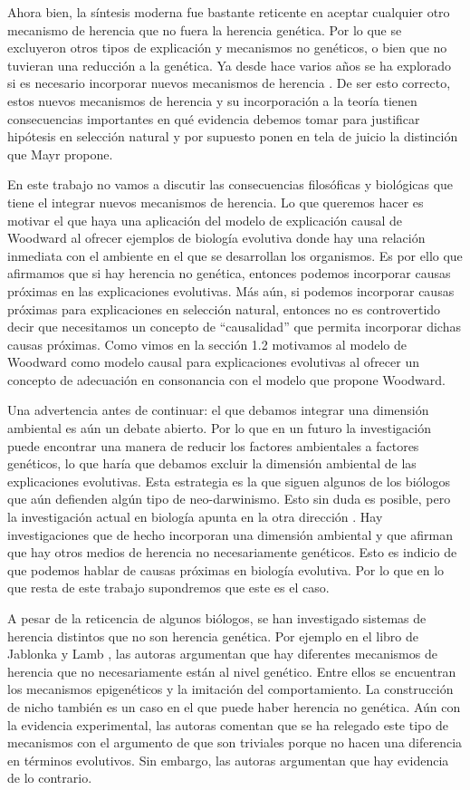 Ahora bien, la síntesis moderna fue bastante reticente en aceptar cualquier otro mecanismo de herencia que no fuera la herencia genética. Por lo que se excluyeron otros tipos de explicación y mecanismos no genéticos, o bien que no tuvieran una reducción a la genética. Ya desde hace varios años se ha explorado si es necesario incorporar nuevos mecanismos de herencia \cite{Jablonka2020}. De ser esto correcto, estos nuevos mecanismos de herencia y su incorporación a la teoría tienen consecuencias importantes en qué evidencia debemos tomar para justificar hipótesis en selección natural y por supuesto ponen en tela de juicio la distinción que Mayr propone.

En este trabajo no vamos a discutir las consecuencias filosóficas y biológicas que tiene el integrar nuevos mecanismos de herencia. Lo que queremos hacer es motivar el que haya una aplicación del modelo de explicación causal de Woodward al ofrecer ejemplos de biología evolutiva donde hay una relación inmediata con el ambiente en el que se desarrollan los organismos. Es por ello que afirmamos que si hay herencia no genética, entonces podemos incorporar causas próximas en las explicaciones evolutivas. Más aún, si podemos incorporar causas próximas para explicaciones en selección natural, entonces no es controvertido decir que necesitamos un concepto de ``causalidad'' que permita incorporar dichas causas próximas. Como vimos en la sección 1.2 motivamos al modelo de Woodward como modelo causal para explicaciones evolutivas al ofrecer un concepto de adecuación en consonancia con el modelo que propone Woodward.

Una advertencia antes de continuar: el que debamos integrar una dimensión ambiental es aún un debate abierto. Por lo que en un futuro la investigación puede encontrar una manera de reducir los factores ambientales a factores genéticos, lo que haría que debamos excluir la dimensión ambiental de las explicaciones evolutivas. Esta estrategia es la que siguen algunos de los biólogos que aún defienden algún tipo de neo-darwinismo. Esto sin duda es posible, pero la investigación actual en biología apunta en la otra dirección  \cite{Bateson2014}. Hay investigaciones que de hecho incorporan una dimensión ambiental y que afirman que hay otros medios de herencia no necesariamente genéticos. Esto es indicio de que podemos hablar de causas próximas en biología evolutiva. Por lo que en lo que resta de este trabajo supondremos que este es el caso.

A pesar de la reticencia de algunos biólogos, se han investigado sistemas de herencia distintos que no son herencia genética. Por ejemplo en el libro de Jablonka y Lamb \citeyear{Jablonka2020}, las autoras argumentan que hay diferentes mecanismos de herencia que no necesariamente están al nivel genético. Entre ellos se encuentran los mecanismos epigenéticos y la imitación del comportamiento. La construcción de nicho también es un caso en el que puede haber herencia no genética. Aún con la evidencia experimental, las autoras comentan que se ha relegado este tipo de mecanismos con el argumento de que son triviales porque no hacen una diferencia en términos evolutivos. Sin embargo, las autoras argumentan que hay evidencia de lo contrario.

